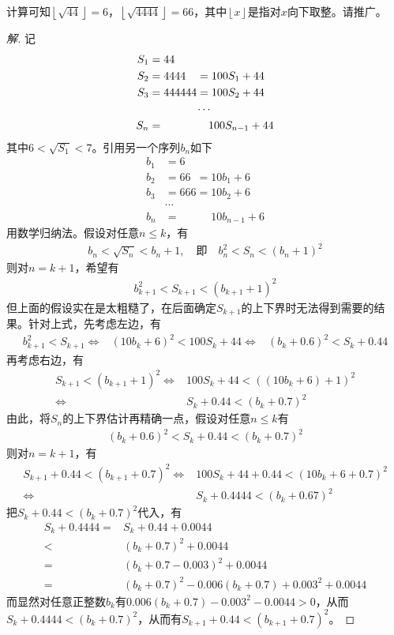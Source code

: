 \begin{example}
  计算可知$\left\lfloor\sqrt{44}\right\rfloor=6$，$\left\lfloor\sqrt{4444}\right\rfloor=66$，其中$\left\lfloor x\right\rfloor$是指对$x$向下取整。请推广。
\end{example}
\begin{proof}[解]
  记
  \begin{align*}
    S_1&=44\\
    S_2&=4444\phantom{44}=100S_1+44\\
    S_3&=444444=100S_2+44\\
    \multicolumn{2}{c}{$\cdots$}\\
    S_n&=\phantom{444444=}100S_{n-1}+44
  \end{align*}
  其中$6<\sqrt{S_1}<7$。引用另一个序列$b_n$如下
  \begin{align*}
    b_1&=6\\
    b_2&=66\phantom{6}=10b_1 + 6\\
    b_3&=666          =10b_2 + 6\\
       &\cdots\\
    b_n&=\phantom{666=}10b_{n-1} + 6
  \end{align*}
  用数学归纳法。假设对任意$n\le k$，有
  \begin{align*}
    b_n<\sqrt{S_n}<b_n+1,\quad\text{即}\quad b_n^2 < S_n < (b_n+1)^2
  \end{align*}
  则对$n=k+1$，希望有
  \begin{align*}
    b_{k+1}^2 < S_{k+1} < (b_{k+1}+1)^2
  \end{align*}
  但上面的假设实在是太粗糙了，在后面确定$S_{k+1}$的上下界时无法得到需要的结果。针对上式，先考虑左边，有
  \begin{align*}
    b_{k+1}^2 < S_{k+1} \iff & (10b_k + 6)^2 < 100S_k + 44
                        \iff & (b_k + 0.6) ^2 < S_k + 0.44
  \end{align*}
  再考虑右边，有
  \begin{align*}
    S_{k+1} < (b_{k+1}+1)^2 \iff & 100S_k+44 < \left((10b_k+6)+1\right)^2\\
    \iff & S_k + 0.44 < (b_k+0.7)^2
  \end{align*}
  由此，将$S_n$的上下界估计再精确一点，假设对任意$n\le k$有
  \begin{align*}
    (b_k+0.6)^2 <S_k+0.44<(b_k+0.7)^2
  \end{align*}
  则对$n=k+1$，有
  \begin{align*}
    S_{k+1} + 0.44 < (b_{k+1} + 0.7)^2 \iff & 100S_k + 44 + 0.44 < (10b_k + 6 + 0.7)^2 \\
    \iff & S_k + 0.4444 < (b_k + 0.67)^2
  \end{align*}
  把$S_k+0.44<(b_k+0.7)^2$代入，有
  \begin{align*}
    S_k+0.4444 = & S_k + 0.44 + 0.0044 \\
               < & (b_k+0.7)^2 + 0.0044\\
               = &(b_k + 0.7 - 0.003)^2 + 0.0044\\
               = & (b_k+0.7)^2 - 0.006(b_k+0.7) + 0.003^2 + 0.0044
  \end{align*}
  而显然对任意正整数$b_k$有$0.006(b_k+0.7) - 0.003^2 - 0.0044>0$，从而$S_k+0.4444 < (b_k+0.7)^2$，从而有$S_{k+1}+0.44<(b_{k+1}+0.7)^2$。


\end{proof}
